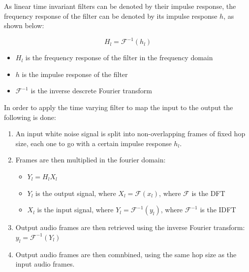 As linear time invariant filters can be denoted by their impulse response, the frequency response of the filter can be denoted by its impulse response $h$, as shown below:

\begin{equation}
    H_l = \mathscr{F}^{-1}(h_l)
\end{equation}

\begin{itemize}
    \item $H_l$ is the frequency response of the filter in the frequency domain
    \item $h$ is the impulse response of the filter
    \item $\mathscr{F}^{-1}$ is the inverse descrete Fourier transform
\end{itemize}

In order to apply the time varying filter to map the input to the output the following is done:

\begin{enumerate}
    \item An input white noise signal is split into non-overlapping frames of fixed hop size, each one to go with a certain impulse response $h_l$.
    \item Frames are then multiplied in the fourier domain: \begin{itemize}
        \item $Y_l = H_l X_l$
        \item $Y_l$ is the output signal, where $X_l = \mathscr{F}(x_l)$, where $\mathscr{F}$ is the \acrfull{DFT}
        \item $X_l$ is the input signal, where $Y_l = \mathscr{F}^{-1}(y_l)$, where $\mathscr{F}^{-1}$ is the \acrfull{IDFT}
    \end{itemize}
    \item Output audio frames are then retrieved using the inverse Fourier transform:
        $y_l = \mathscr{F}^{-1}(Y_l)$
    \item Output audio frames are then comnbined, using the same hop size as the input audio frames.
\end{enumerate}

\vspace{0.5cm}
\vspace{0.5cm}

